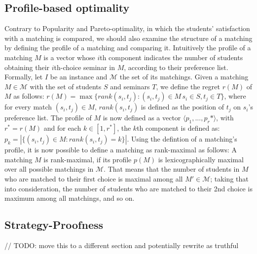 \subsection{Profile-based optimality}
Contrary to Popularity and Pareto-optimality, in which the students' satisfaction with a matching is compared, we should also examine the structure of a matching by defining the profile of a matching and comparing it. Intuitively the profile of a matching $M$ is a vector whose $i$th component indicates the number of students obtaining their $i$th-choice seminar in $M$, according to their preference list. 
\newline
Formally, let $I$ be an instance and $\mathcal{M}$ the set of its matchings. Given a matching $M \in \mathcal{M}$ with the set of students $S$ and seminars $T$, we define the regret $r(M)$ of $M$ as follows:
$r(M) = \max \{rank(s_i, t_j): (s_i, t_j)\in M\, s_i \in S, t_j \in T\}$, where for every match $(s_i, t_j) \in M$, $rank(s_i, t_j)$ is defined as the position of $t_j$ on $s_i$'s preference list. The profile of $M$ is now defined as a vector $\langle p_1,..., p_r* \rangle$, with $r^* = r(M)$ and for each $k \in [1,r^*]$, the $k$th component is defined as: $p_k=|\{(s_i, t_j) \in M: rank(s_i, t_j) = k\}|$.\cite{algorithmics}
\newline
Using the defintion of a matching's profile, it is now possible to define a matching as rank-maximal as follows: A matching $M$ is rank-maximal, if its profile $p(M)$ is lexicographically maximal over all possible matchings in $\mathcal{M}$. That means that the number of students in $M$ who are matched to their first choice is maximal among all $M' \in \mathcal{M}$; taking that into consideration, the number of students who are matched to their 2nd choice is maximum among all matchings, and so on.

\subsection{Strategy-Proofness}
// TODO: move this to a different section and potentially rewrite as truthful
\newline

